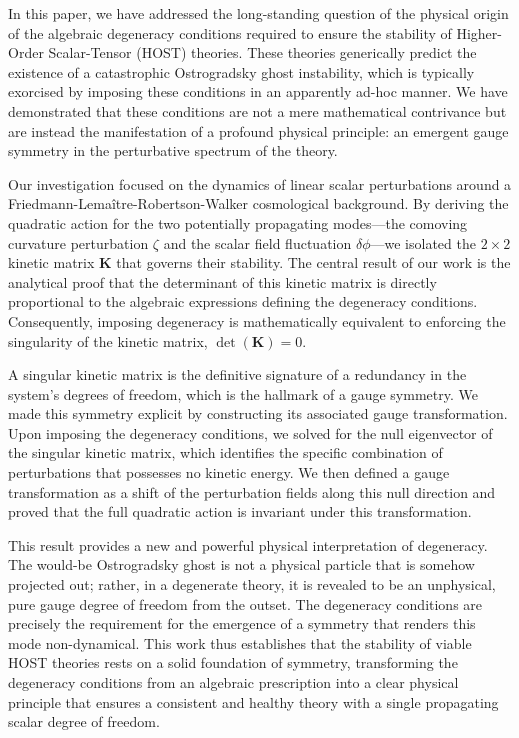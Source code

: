 \documentclass[twocolumn]{aastex631}
\begin{document}
In this paper, we have addressed the long-standing question of the physical origin of the algebraic degeneracy conditions required to ensure the stability of Higher-Order Scalar-Tensor (HOST) theories. These theories generically predict the existence of a catastrophic Ostrogradsky ghost instability, which is typically exorcised by imposing these conditions in an apparently ad-hoc manner. We have demonstrated that these conditions are not a mere mathematical contrivance but are instead the manifestation of a profound physical principle: an emergent gauge symmetry in the perturbative spectrum of the theory.

Our investigation focused on the dynamics of linear scalar perturbations around a Friedmann-Lema\^itre-Robertson-Walker cosmological background. By deriving the quadratic action for the two potentially propagating modes---the comoving curvature perturbation $\zeta$ and the scalar field fluctuation $\delta\phi$---we isolated the $2 \times 2$ kinetic matrix $\mathbf{K}$ that governs their stability. The central result of our work is the analytical proof that the determinant of this kinetic matrix is directly proportional to the algebraic expressions defining the degeneracy conditions. Consequently, imposing degeneracy is mathematically equivalent to enforcing the singularity of the kinetic matrix, $\det(\mathbf{K}) = 0$.

A singular kinetic matrix is the definitive signature of a redundancy in the system's degrees of freedom, which is the hallmark of a gauge symmetry. We made this symmetry explicit by constructing its associated gauge transformation. Upon imposing the degeneracy conditions, we solved for the null eigenvector of the singular kinetic matrix, which identifies the specific combination of perturbations that possesses no kinetic energy. We then defined a gauge transformation as a shift of the perturbation fields along this null direction and proved that the full quadratic action is invariant under this transformation.

This result provides a new and powerful physical interpretation of degeneracy. The would-be Ostrogradsky ghost is not a physical particle that is somehow projected out; rather, in a degenerate theory, it is revealed to be an unphysical, pure gauge degree of freedom from the outset. The degeneracy conditions are precisely the requirement for the emergence of a symmetry that renders this mode non-dynamical. This work thus establishes that the stability of viable HOST theories rests on a solid foundation of symmetry, transforming the degeneracy conditions from an algebraic prescription into a clear physical principle that ensures a consistent and healthy theory with a single propagating scalar degree of freedom.
\end{document}
